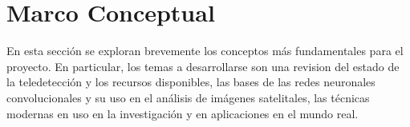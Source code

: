 \section{Marco Conceptual}

En esta sección se exploran brevemente los conceptos más fundamentales para el proyecto. En particular, los temas a
desarrollarse son una revision del estado de la teledetección y los recursos disponibles, las bases de las redes
neuronales convolucionales y su uso en el análisis de imágenes satelitales, las técnicas modernas en uso en la
investigación y en aplicaciones en el mundo real.






